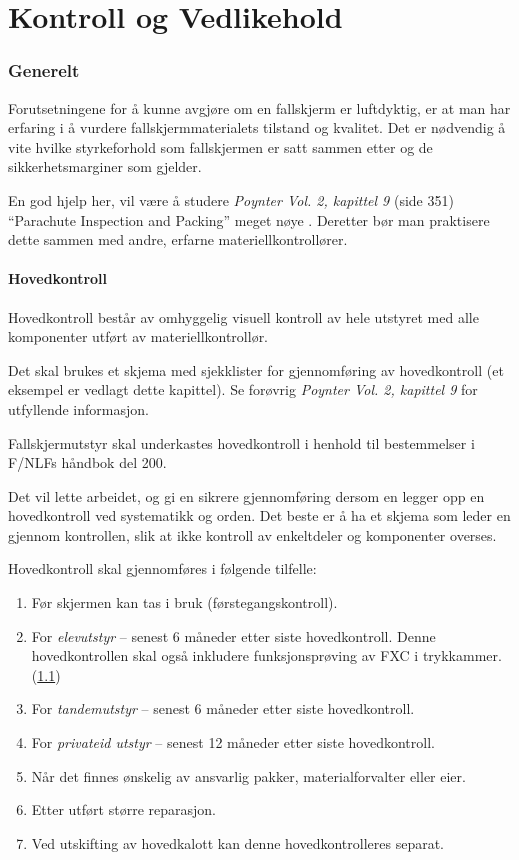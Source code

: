 \part{Kontroll og Vedlikehold}

\section{Generelt}
Forutsetningene for å kunne avgjøre om en fallskjerm er luftdyktig, er at man har erfaring i å vurdere fallskjermmaterialets tilstand og kvalitet. Det er nødvendig å vite hvilke styrkeforhold som fallskjermen er satt sammen etter og de sikkerhetsmarginer som gjelder.

En god hjelp her, vil være å studere \emph{Poynter Vol. 2, kapittel 9} (side 351) ``Parachute Inspection and Packing'' meget nøye \cite{poynter2}. Deretter bør man praktisere dette sammen med andre, erfarne materiellkontrollører.

\subsection{Hovedkontroll}
\label{sec:kapittel8}
Hovedkontroll består av omhyggelig visuell kontroll av hele utstyret med alle komponenter utført av materiellkontrollør.

Det skal brukes et skjema med sjekklister for gjennomføring av hovedkontroll (et eksempel er vedlagt dette kapittel). Se forøvrig \emph{Poynter Vol. 2, kapittel 9} for utfyllende informasjon.

Fallskjermutstyr skal underkastes hovedkontroll i henhold til bestemmelser i F/NLFs håndbok del 200.

Det vil lette arbeidet, og gi en sikrere gjennomføring dersom en legger opp en hovedkontroll ved systematikk og orden. Det beste er å ha et skjema som leder en gjennom kontrollen, slik at ikke kontroll av enkeltdeler og komponenter overses.

Hovedkontroll skal gjennomføres i følgende tilfelle:
\begin{enumerate}
	\item Før skjermen kan tas i bruk (førstegangskontroll).
	\item For \emph{elevutstyr} – senest 6 måneder etter siste hovedkontroll.
	Denne hovedkontrollen skal også inkludere funksjonsprøving av FXC i trykkammer. (\ref{sec:kapittel8})
	\item For \emph{tandemutstyr} – senest 6 måneder etter siste hovedkontroll.
	\item For \emph{privateid utstyr} – senest 12 måneder etter siste hovedkontroll.
	\item Når det finnes ønskelig av ansvarlig pakker, materialforvalter eller eier.
	\item Etter utført større reparasjon.
	\item Ved utskifting av hovedkalott kan denne hovedkontrolleres separat.
\end{enumerate}

